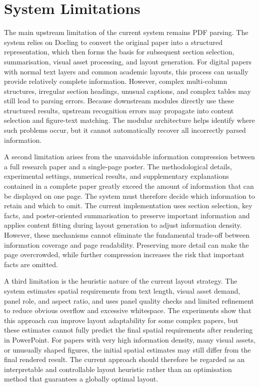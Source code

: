 \documentclass[12pt,oneside]{report}
\begin{document}
\section{System Limitations}

The main upstream limitation of the current system remains PDF parsing. The system relies on Docling to convert the original paper into a structured representation, which then forms the basis for subsequent section selection, summarisation, visual asset processing, and layout generation. For digital papers with normal text layers and common academic layouts, this process can usually provide relatively complete information. However, complex multi-column structures, irregular section headings, unusual captions, and complex tables may still lead to parsing errors. Because downstream modules directly use these structured results, upstream recognition errors may propagate into content selection and figure-text matching. The modular architecture helps identify where such problems occur, but it cannot automatically recover all incorrectly parsed information.

\vspace{1em}

A second limitation arises from the unavoidable information compression between a full research paper and a single-page poster. The methodological details, experimental settings, numerical results, and supplementary explanations contained in a complete paper greatly exceed the amount of information that can be displayed on one page. The system must therefore decide which information to retain and which to omit. The current implementation uses section selection, key facts, and poster-oriented summarisation to preserve important information and applies content fitting during layout generation to adjust information density. However, these mechanisms cannot eliminate the fundamental trade-off between information coverage and page readability. Preserving more detail can make the page overcrowded, while further compression increases the risk that important facts are omitted.

\vspace{1em}

A third limitation is the heuristic nature of the current layout strategy. The system estimates spatial requirements from text length, visual asset demand, panel role, and aspect ratio, and uses panel quality checks and limited refinement to reduce obvious overflow and excessive whitespace. The experiments show that this approach can improve layout adaptability for some complex papers, but these estimates cannot fully predict the final spatial requirements after rendering in PowerPoint. For papers with very high information density, many visual assets, or unusually shaped figures, the initial spatial estimates may still differ from the final rendered result. The current approach should therefore be regarded as an interpretable and controllable layout heuristic rather than an optimisation method that guarantees a globally optimal layout.
\end{document}
